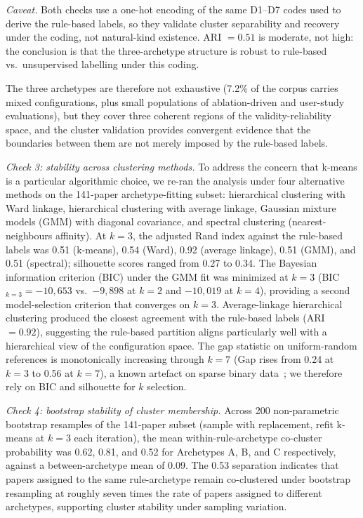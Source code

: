 \documentclass[acmsmall, nonacm, screen]{acmart}
\begin{document}
\emph{Caveat.} Both checks use a one-hot encoding of the same D1--D7
codes used to derive the rule-based labels, so they validate cluster
separability and recovery under the coding, not natural-kind
existence. ARI $=0.51$ is moderate, not high: the conclusion is
that the three-archetype structure is robust to rule-based vs.\
unsupervised labelling under this coding.

The three archetypes are therefore not exhaustive (7.2\% of the
corpus carries mixed configurations, plus small populations of
ablation-driven and user-study evaluations), but they cover three
coherent regions of the validity-reliability space, and the cluster
validation provides convergent evidence that the boundaries between
them are not merely imposed by the rule-based labels.

\emph{Check 3: stability across clustering methods.} To address the
concern that k-means is a particular algorithmic choice, we re-ran the
analysis under four alternative methods on the 141-paper
archetype-fitting subset: hierarchical clustering with Ward linkage,
hierarchical clustering with average linkage, Gaussian mixture
models (GMM) with diagonal covariance, and spectral clustering
(nearest-neighbours affinity). At $k=3$, the adjusted Rand index
against the rule-based labels was 0.51 (k-means), 0.54 (Ward), 0.92
(average linkage), 0.51 (GMM), and 0.51 (spectral); silhouette scores
ranged from 0.27 to 0.34. The Bayesian information criterion (BIC)
under the GMM fit was minimized at $k=3$
(BIC$_{k=3} = -10{,}653$ vs.\ $-9{,}898$ at $k=2$ and $-10{,}019$ at $k=4$),
providing a second model-selection criterion that converges on
$k=3$. Average-linkage hierarchical clustering produced the closest
agreement with the rule-based labels (ARI~$=0.92$), suggesting the
rule-based partition aligns particularly well with a hierarchical
view of the configuration space. The gap statistic on uniform-random
references is monotonically increasing through $k=7$ (Gap rises from
0.24 at $k=3$ to 0.56 at $k=7$), a known artefact on sparse binary
data~\cite{tibshirani2001gap, sugar2003finding}; we therefore rely on
BIC and silhouette for $k$ selection.

\emph{Check 4: bootstrap stability of cluster membership.} Across 200
non-parametric bootstrap resamples of the 141-paper subset (sample
with replacement, refit k-means at $k=3$ each iteration), the mean
within-rule-archetype co-cluster probability was 0.62, 0.81, and 0.52
for Archetypes A, B, and C respectively, against a between-archetype
mean of 0.09. The 0.53 separation indicates that papers assigned to
the same rule-archetype remain co-clustered under bootstrap
resampling at roughly seven times the rate of papers assigned to
different archetypes, supporting cluster stability under sampling
variation.
\end{document}
